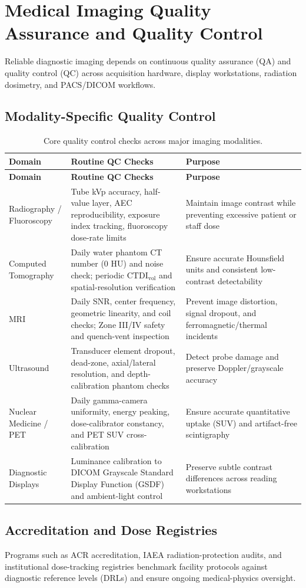\chapter{Medical Imaging Quality Assurance and Quality Control}
\label{app:imaging_qc}

Reliable diagnostic imaging depends on continuous quality assurance (QA) and quality control (QC) across acquisition hardware, display workstations, radiation dosimetry, and PACS/DICOM workflows.

\section{Modality-Specific Quality Control}

\begin{longtable}{@{}p{}p{}p{}@{}}
\caption{Core quality control checks across major imaging modalities.}
\label{tab:app_imaging_qc} \\
\toprule
\textbf{Domain} & \textbf{Routine QC Checks} & \textbf{Purpose} \\
\midrule
\endfirsthead
\toprule
\textbf{Domain} & \textbf{Routine QC Checks} & \textbf{Purpose} \\
\midrule
\endhead
Radiography / Fluoroscopy & Tube kVp accuracy, half-value layer, AEC reproducibility, exposure index tracking, fluoroscopy dose-rate limits & Maintain image contrast while preventing excessive patient or staff dose \\
Computed Tomography & Daily water phantom CT number (0 HU) and noise check; periodic $\text{CTDI}_{\text{vol}}$ and spatial-resolution verification & Ensure accurate Hounsfield units and consistent low-contrast detectability \\
MRI & Daily SNR, center frequency, geometric linearity, and coil checks; Zone III/IV safety and quench-vent inspection & Prevent image distortion, signal dropout, and ferromagnetic/thermal incidents \\
Ultrasound & Transducer element dropout, dead-zone, axial/lateral resolution, and depth-calibration phantom checks & Detect probe damage and preserve Doppler/grayscale accuracy \\
Nuclear Medicine / PET & Daily gamma-camera uniformity, energy peaking, dose-calibrator constancy, and PET SUV cross-calibration & Ensure accurate quantitative uptake (SUV) and artifact-free scintigraphy \\
Diagnostic Displays & Luminance calibration to DICOM Grayscale Standard Display Function (GSDF) and ambient-light control & Preserve subtle contrast differences across reading workstations \\
\bottomrule
\end{longtable}

\section{Accreditation and Dose Registries}
Programs such as ACR accreditation, IAEA radiation-protection audits, and institutional dose-tracking registries benchmark facility protocols against diagnostic reference levels (DRLs) and ensure ongoing medical-physics oversight.
